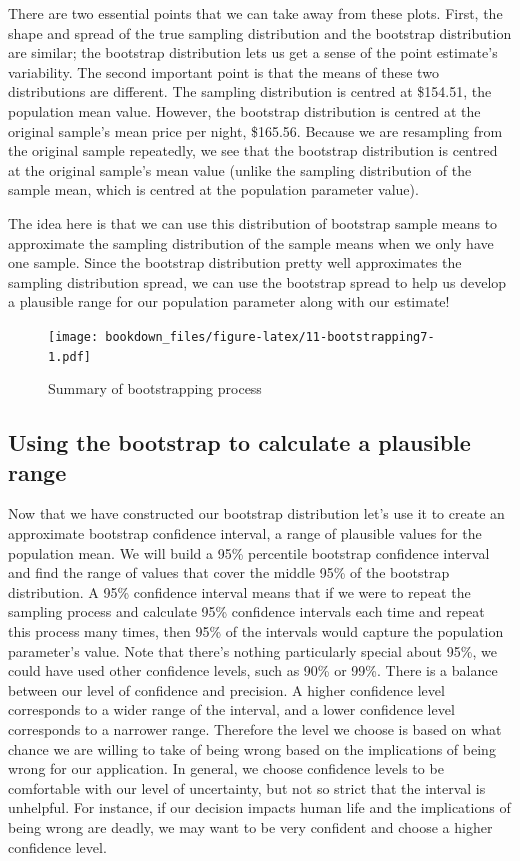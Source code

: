 \documentclass[
]{krantz}
\begin{document}
There are two essential points that we can take away from these plots. First, the shape and spread of the true sampling distribution and the bootstrap distribution are similar; the bootstrap distribution lets us get a sense of the point estimate's variability. The second important point is that the means of these two distributions are different. The sampling distribution is centred at \$154.51, the population mean value. However, the bootstrap distribution is centred at the original sample's mean price per night, \$165.56. Because we are resampling from the original sample repeatedly, we see that the bootstrap distribution is centred at the original sample's mean value (unlike the sampling distribution of the sample mean, which is centred at the population parameter value).

The idea here is that we can use this distribution of bootstrap sample means to approximate the sampling distribution of the sample means when we only have one sample. Since the bootstrap distribution pretty well approximates the sampling distribution spread, we can use the bootstrap spread to help us develop a plausible range for our population parameter along with our estimate!

\begin{figure}
\centering
\texttt{[image: bookdown\_files/figure-latex/11-bootstrapping7-1.pdf]}
\caption{\label{fig:11-bootstrapping7}Summary of bootstrapping process}
\end{figure}

\hypertarget{using-the-bootstrap-to-calculate-a-plausible-range}{%
\subsection{Using the bootstrap to calculate a plausible range}\label{using-the-bootstrap-to-calculate-a-plausible-range}}

Now that we have constructed our bootstrap distribution let's use it to create an approximate bootstrap confidence interval, a range of plausible values for the population mean. We will build a 95\% percentile bootstrap confidence interval and find the range of values that cover the middle 95\% of the bootstrap distribution. A 95\% confidence interval means that if we were to repeat the sampling process and calculate 95\% confidence intervals each time and repeat this process many times, then 95\% of the intervals would capture the population parameter's value. Note that there's nothing particularly special about 95\%, we could have used other confidence levels, such as 90\% or 99\%. There is a balance between our level of confidence and precision. A higher confidence level corresponds to a wider range of the interval, and a lower confidence level corresponds to a narrower range. Therefore the level we choose is based on what chance we are willing to take of being wrong based on the implications of being wrong for our application. In general, we choose confidence levels to be comfortable with our level of uncertainty, but not so strict that the interval is unhelpful. For instance, if our decision impacts human life and the implications of being wrong are deadly, we may want to be very confident and choose a higher confidence level.
\end{document}
